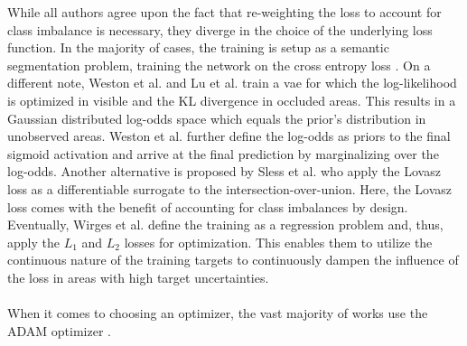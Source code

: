 While all authors agree upon the fact that re-weighting the loss to account for class imbalance is necessary, they diverge in the choice of the underlying loss function. In the majority of cases, the training is setup as a semantic segmentation problem, training the network on the cross entropy loss \cite{prophet2019semantic,lombacher2017semantic,hendy2020fishing,wulff2018early}. On a different note, Weston et al. \cite{weston2019probably} and Lu et al. \cite{lu2019monocular} train a \gls{vae} \cite{kingma2013auto} for which the log-likelihood is optimized in visible and the KL divergence in occluded areas. This results in a Gaussian distributed log-odds space which equals the prior's distribution in unobserved areas. Weston et al. further define the log-odds as priors to the final sigmoid activation and arrive at the final prediction by marginalizing over the log-odds. Another alternative is proposed by Sless et al. \cite{sless2019road} who apply the Lovasz loss \cite{berman2018lovasz} as a differentiable surrogate to the intersection-over-union. Here, the Lovasz loss comes with the benefit of accounting for class imbalances by design. Eventually, Wirges et al. \cite{wirges2018evidential} define the training as a regression problem and, thus, apply the $L_1$ and $L_2$ losses for optimization. This enables them to utilize the continuous nature of the training targets to continuously dampen the influence of the loss in areas with high target uncertainties.
\\\\
When it comes to choosing an optimizer, the vast majority of works use the ADAM optimizer \cite{kingma2014adam,verdoja2019deep,wirges2018evidential,weston2019probably,schulter2018learning}.
%
